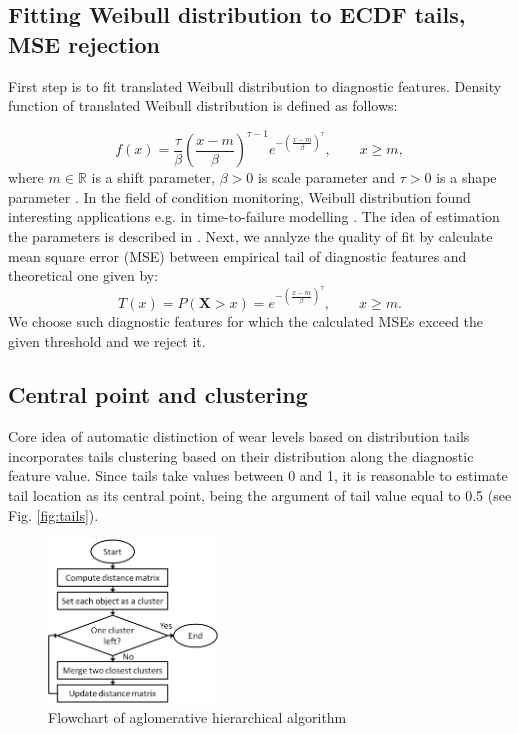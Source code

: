 \documentclass[10pt]{article}
\begin{document}
\subsection{Fitting Weibull distribution to ECDF tails, MSE rejection}
\label{weib}
First step is to fit translated Weibull distribution to diagnostic features. Density function of translated Weibull distribution is defined as follows:


\begin{equation}
\label{weibull}
    f(x)=\frac{\tau}{\beta} \left( \frac{x-m}{\beta} \right)^{\tau -1} e^{-\left ( \frac{x-m}{\beta} \right)^{\tau}},\qquad x\geqslant m,
\end{equation}
where $m \in \mathbb{R}$ is a shift parameter, $\beta>0$ is scale parameter and $\tau>0$ is a shape parameter \cite{coles2001introduction}. In the field of condition monitoring, Weibull distribution found interesting applications e.g. in time-to-failure modelling \cite{sikorska2011prognostic,wang2002model,zhou2013transformer}. The idea of estimation the parameters is described in \cite{stefaniak2016diagnostic}. Next, we analyze the quality of fit by calculate mean square error (MSE) between empirical tail of diagnostic features and theoretical one given by: 
\begin{equation}
\label{tail}
    T(x)=P(\textbf{X}>x)= e^{-\left ( \frac{x-m}{\beta} \right)^{\tau}},\qquad x\geqslant m.
\end{equation}
We choose such diagnostic features for which the calculated MSEs exceed the given threshold and we reject it.


\subsection{Central point and clustering}
\label{clust}
Core idea of automatic distinction of wear levels based on distribution tails incorporates tails clustering based on their distribution along the diagnostic feature value. Since tails take values between 0 and 1, it is reasonable to estimate tail location as its central point, being the argument of tail value equal to 0.5 (see Fig. \ref{fig:tails}). 

\begin{figure}[h!]
\centering
\includegraphics[width=0.4\textwidth]{wykresy/agl}
\caption{Flowchart of aglomerative hierarchical algorithm}
\label{fig:agl}
\end{figure}
\end{document}
